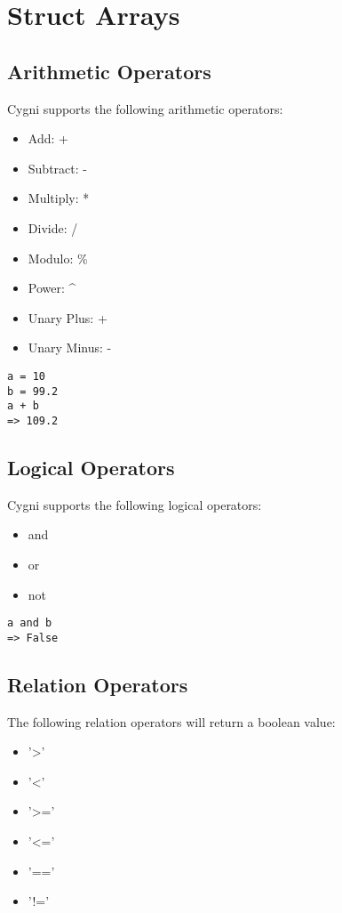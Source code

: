 \chapter{Struct Arrays}

\section{Arithmetic Operators}
 Cygni supports the following arithmetic operators:
 \begin{itemize}
 	\item Add: +
 	\item Subtract: -
 	\item Multiply: *
 	\item Divide: /
 	\item Modulo: \%
 	\item Power: \^{}
 	\item Unary Plus: +
 	\item Unary Minus: -
\end{itemize}
\begin{lstlisting}
a = 10
b = 99.2
a + b
=> 109.2
\end{lstlisting}
\section{Logical Operators}
Cygni supports the following logical operators:
\begin{itemize}
 	\item and
 	\item or
 	\item not
\end{itemize}
\begin{lstlisting}
a and b
=> False
\end{lstlisting}
\section{Relation Operators}
The following relation operators will return a boolean value:
\begin{itemize}
	\item '>'
	\item '<'
	\item '>='
	\item '<='
	\item '=='
	\item '!='
\end{itemize}
